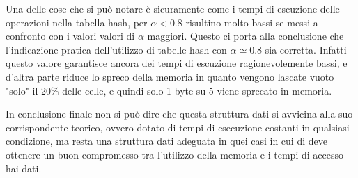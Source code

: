 \documentclass{article}
\begin{document}
Una delle cose che si può notare è sicuramente come i tempi di escuzione delle operazioni nella tabella hash, per $\alpha < 0.8$ risultino molto bassi se messi a confronto con i valori valori di $\alpha$ maggiori. Questo ci porta alla conclusione che l'indicazione pratica dell'utilizzo di tabelle hash con $\alpha \simeq 0.8$ sia corretta. Infatti questo valore garantisce ancora dei tempi di escuzione ragionevolemente bassi, e d'altra parte riduce lo spreco della memoria in quanto vengono lascate vuoto "solo" il 20\% delle celle, e quindi solo 1 byte su 5 viene sprecato in memoria.

In conclusione finale non si può dire che questa struttura dati si avvicina alla suo corrispondente teorico, ovvero dotato di tempi di esecuzione costanti in qualsiasi condizione, ma resta una struttura dati adeguata in quei casi in cui di deve ottenere un buon compromesso tra l'utilizzo della memoria e i tempi di accesso hai dati.

\newpage

\listoffigures
\listoftables
\end{document}
